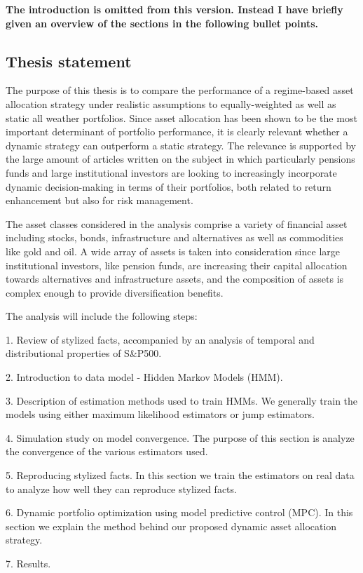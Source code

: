 \textbf{The introduction is omitted from this version. Instead I have briefly given an overview of the sections in the following bullet points.}

\subsection*{Thesis statement}
The purpose of this thesis is to compare the performance of a regime-based asset allocation strategy under realistic assumptions to equally-weighted as well as static all weather portfolios. Since asset allocation has been shown to be the most important determinant of portfolio performance, it is clearly relevant whether a dynamic strategy can outperform a static strategy. The relevance is supported by the large amount of articles written on the subject in which particularly pensions funds and large institutional investors are looking to increasingly incorporate dynamic decision-making in terms of their portfolios, both related to return enhancement but also for risk management.

The asset classes considered in the analysis comprise a variety of financial asset including stocks, bonds, infrastructure and alternatives as well as commodities like gold and oil. A wide array of assets is taken into consideration since large institutional investors, like pension funds, are increasing their capital allocation towards alternatives and infrastructure assets, and the composition of assets is complex enough to provide diversification benefits. 

The analysis will include the following steps:

1. Review of stylized facts, accompanied by an analysis of temporal and distributional properties of S\&P500.

2. Introduction to data model - Hidden Markov Models (HMM).

3. Description of estimation methods used to train HMMs. We generally train the models using either maximum likelihood estimators or jump estimators.

4. Simulation study on model convergence. The purpose of this section is analyze the convergence of the various estimators used.

5. Reproducing stylized facts. In this section we train the estimators on real data to analyze how well they can reproduce stylized facts.

6. Dynamic portfolio optimization using model predictive control (MPC). In this section we explain the method behind our proposed dynamic asset allocation strategy.

7. Results.


